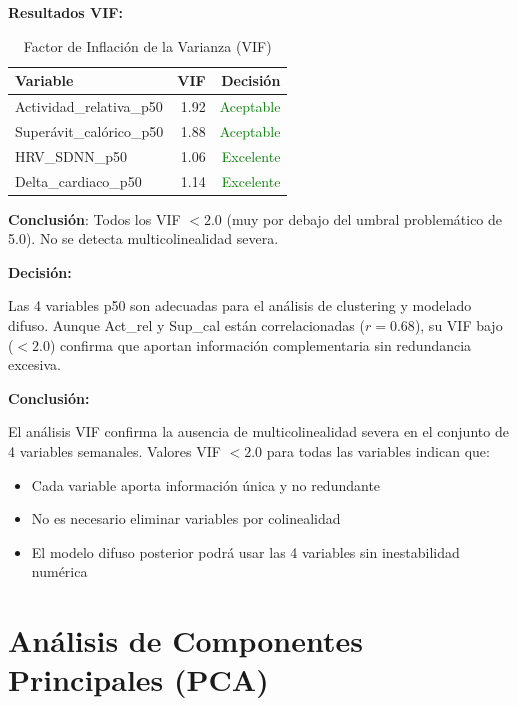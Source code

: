 \documentclass[12pt,letterpaper,twoside]{report}
\begin{document}
\begin{calculobox}
\textbf{Resultados VIF:}

\begin{table}[H]
\centering
\caption{Factor de Inflación de la Varianza (VIF)}
\label{tab:vif}
\begin{tabular}{@{}lrr@{}}
\toprule
\textbf{Variable} & \textbf{VIF} & \textbf{Decisión} \\
\midrule
Actividad\_relativa\_p50     & 1.92 & \textcolor{green}{Aceptable} \\
Superávit\_calórico\_p50     & 1.88 & \textcolor{green}{Aceptable} \\
HRV\_SDNN\_p50               & 1.06 & \textcolor{green}{Excelente} \\
Delta\_cardiaco\_p50         & 1.14 & \textcolor{green}{Excelente} \\
\bottomrule
\end{tabular}
\end{table}

\textbf{Conclusión}: Todos los VIF $< 2.0$ (muy por debajo del umbral problemático de 5.0). No se detecta multicolinealidad severa.
\end{calculobox}

\begin{decisionbox}
\textbf{Decisión:}

Las 4 variables p50 son adecuadas para el análisis de clustering y modelado difuso. Aunque Act\_rel y Sup\_cal están correlacionadas ($r=0.68$), su VIF bajo ($<2.0$) confirma que aportan información complementaria sin redundancia excesiva.
\end{decisionbox}

\begin{conclusionbox}
\textbf{Conclusión:}

El análisis VIF confirma la ausencia de multicolinealidad severa en el conjunto de 4 variables semanales. Valores VIF $< 2.0$ para todas las variables indican que:
\begin{itemize}[noitemsep]
    \item Cada variable aporta información única y no redundante
    \item No es necesario eliminar variables por colinealidad
    \item El modelo difuso posterior podrá usar las 4 variables sin inestabilidad numérica
\end{itemize}
\end{conclusionbox}

\section{Análisis de Componentes Principales (PCA)}
\end{document}
